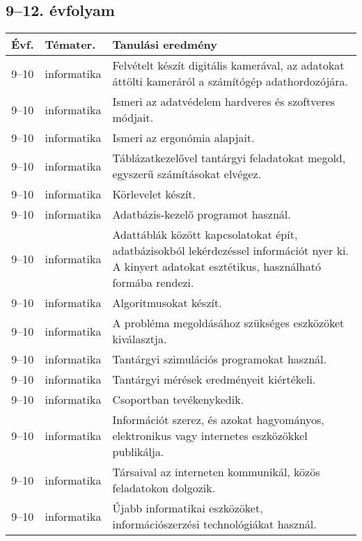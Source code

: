 \subsection{9--12. évfolyam}
\begin{small}
  \begin{longtable}{c | p{2cm} |  p{11cm} }
    \textbf{Évf.} & \textbf{Témater.} & \textbf{Tanulási eredmény} \\ \hline \hline
    \endhead

              9--10 & informatika & Felvételt készít digitális kamerával, az adatokat áttölti kameráról a számítógép adathordozójára. \\ \hline
              9--10 & informatika & Ismeri az adatvédelem hardveres és szoftveres módjait. \\ \hline
              9--10 & informatika & Ismeri az ergonómia alapjait. \\ \hline
              9--10 & informatika & Táblázatkezelővel tantárgyi feladatokat megold, egyszerű számításokat elvégez. \\ \hline
              9--10 & informatika & Körlevelet készít. \\ \hline
              9--10 & informatika & Adatbázis-kezelő programot használ. \\ \hline
              9--10 & informatika & Adattáblák között kapcsolatokat épít, adatbázisokból lekérdezéssel információt nyer ki. A kinyert adatokat esztétikus, használható formába rendezi. \\ \hline
              9--10 & informatika & Algoritmusokat készít. \\ \hline
              9--10 & informatika & A probléma megoldásához szükséges eszközöket kiválasztja. \\ \hline
              9--10 & informatika & Tantárgyi szimulációs programokat használ. \\ \hline
              9--10 & informatika & Tantárgyi mérések eredményeit kiértékeli. \\ \hline
              9--10 & informatika & Csoportban tevékenykedik. \\ \hline
              9--10 & informatika & Információt szerez, és azokat hagyományos, elektronikus vagy internetes eszközökkel publikálja. \\ \hline
              9--10 & informatika & Társaival az interneten kommunikál, közös feladatokon dolgozik. \\ \hline
              9--10 & informatika & Újabb informatikai eszközöket, információszerzési technológiákat használ. \\ \hline

\end{longtable}
\end{small}
